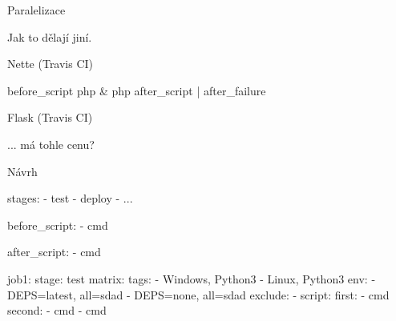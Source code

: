 \sec Paralelizace

Jak to dělají jiní.

\secc Nette (Travis CI)

\begtt
before_script
php & php
after_script | after_failure
\endtt

\secc Flask (Travis CI)


... má tohle cenu?

\secc Návrh

\begtt

stages:
	- test
	- deploy
	- ...

before_script:
	- cmd

after_script:
	- cmd

job1:
	stage: test
	matrix:
		tags:
			- Windows, Python3
			- Linux, Python3
		env:
			- DEPS=latest, all=sdad
			- DEPS=none, all=sdad
		exclude:
			- 
	script:
		first:
			- cmd
		second:
			- cmd
			- cmd


\endtt